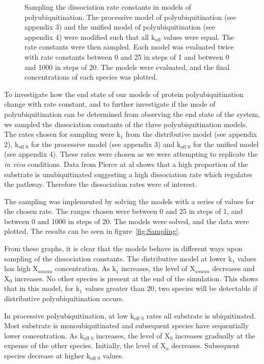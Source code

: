 \documentclass[11pt]{article}
\begin{document}
{\begin{figure}[H]
	\caption{Sampling the dissociation rate constants in models of polyubiquitination. The processive model of polyubiquitination (see appendix 3) and the unified model of polyubiquitination (see appendix 4) were modified such that all k$_\text{off}$ values were equal. The rate constants were then sampled. Each model was evaluated twice with rate constants between 0 and 25 in steps of 1 and between 0 and 1000 in steps of 20. The models were evaluated, and the final concentrations of each species was plotted.}
	\label{fig:reSampling}
\end{figure}
}

To investigate how the end state of our models of protein polyubiquitination change with rate constant, and to further investigate if the mode of polyubiquitination can be determined from observing the end state of the system, we sampled the dissociation constants of the three polyubiquitination models. The rates chosen for sampling were k$_1$ from the distributive model (see appendix 2), k$_\text{off 0}$ for the processive model (see appendix 3) and k$_\text{off 0}$ for the unified model (see appendix 4). These rates were chosen as we were attempting to replicate the \emph{in vivo} conditions. Data from Pierce at al\cite{pierce2009detection} shows that a high proportion of the substrate is unubiquitinated suggesting a high dissociation rate which regulates the pathway. Therefore the dissociation rates were of interest.

The sampling was implemented by solving the models with a series of values for the chosen rate. The ranges chosen were between 0 and 25 in steps of 1, and between 0 and 1000 in steps of 20. The models were solved, and the data were plotted. The results can be seen in figure~\ref{fig:Sampling}.

From these graphs, it is clear that the models behave in different ways upon sampling of the dissociation constants. The distributive model at lower k$_1$ values has high X$_{uuuuu}$ concentration. As k$_1$ increases, the level of X$_{uuuuu}$ decreases and X$_0$ increases. No other species is present at the end of the simulation. This shows that in this model, for k$_1$ values greater than 20, two species will be detectable if distributive polyubiquitination occurs.

In processive polyubiquitination, at low k$_\text{off 0}$ rates all substrate is ubiquitinated. Most substrate is monoubiquitinated and subsequent species have sequentially lower concentration. As k$_\text{off 0}$ increases, the level of X$_0$ increases gradually at the expense of the other species. Initially, the level of X$_u$ decreases. Subsequent species decrease at higher k$_\text{off 0}$ values.
\end{document}
